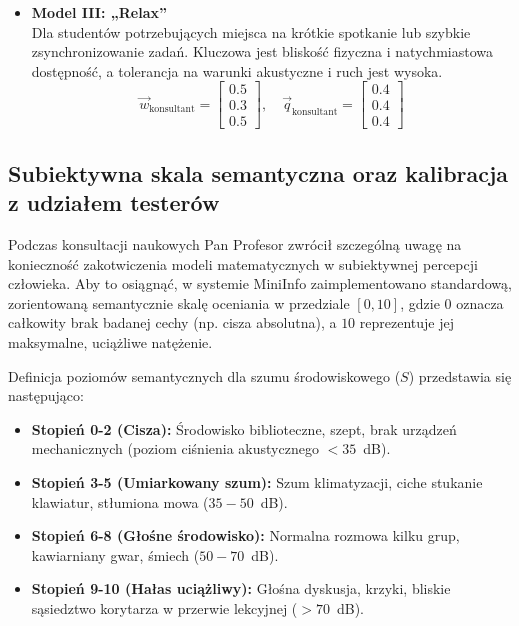\documentclass[14pt,a4paper]{extarticle}
\begin{document}
\begin{itemize}
    \item \textbf{Model III: „Relax”} \\
    Dla studentów potrzebujących miejsca na krótkie spotkanie lub szybkie zsynchronizowanie zadań. Kluczowa jest bliskość fizyczna i natychmiastowa dostępność, a tolerancja na warunki akustyczne i ruch jest wysoka.
    \begin{equation}
    \vec{w}_{\text{konsultant}} = \begin{bmatrix} 0.5 \\ 0.3 \\ 0.5 \end{bmatrix}, \quad \vec{q}_{\text{konsultant}} = \begin{bmatrix} 0.4 \\ 0.4 \\ 0.4 \end{bmatrix}
    \end{equation}
\end{itemize}

\subsection{Subiektywna skala semantyczna oraz kalibracja z udziałem testerów}
Podczas konsultacji naukowych Pan Profesor zwrócił szczególną uwagę na konieczność zakotwiczenia modeli matematycznych w subiektywnej percepcji człowieka. Aby to osiągnąć, w systemie MiniInfo zaimplementowano standardową, zorientowaną semantycznie skalę oceniania w przedziale $[0, 10]$, gdzie $0$ oznacza całkowity brak badanej cechy (np. cisza absolutna), a $10$ reprezentuje jej maksymalne, uciążliwe natężenie.

Definicja poziomów semantycznych dla szumu środowiskowego ($S$) przedstawia się następująco:
\begin{itemize}
    \item \textbf{Stopień 0-2 (Cisza):} Środowisko biblioteczne, szept, brak urządzeń mechanicznych (poziom ciśnienia akustycznego $< 35$~dB).
    \item \textbf{Stopień 3-5 (Umiarkowany szum):} Szum klimatyzacji, ciche stukanie klawiatur, stłumiona mowa ($35 - 50$~dB).
    \item \textbf{Stopień 6-8 (Głośne środowisko):} Normalna rozmowa kilku grup, kawiarniany gwar, śmiech ($50 - 70$~dB).
    \item \textbf{Stopień 9-10 (Hałas uciążliwy):} Głośna dyskusja, krzyki, bliskie sąsiedztwo korytarza w przerwie lekcyjnej ($> 70$~dB).
\end{itemize}
\end{document}
